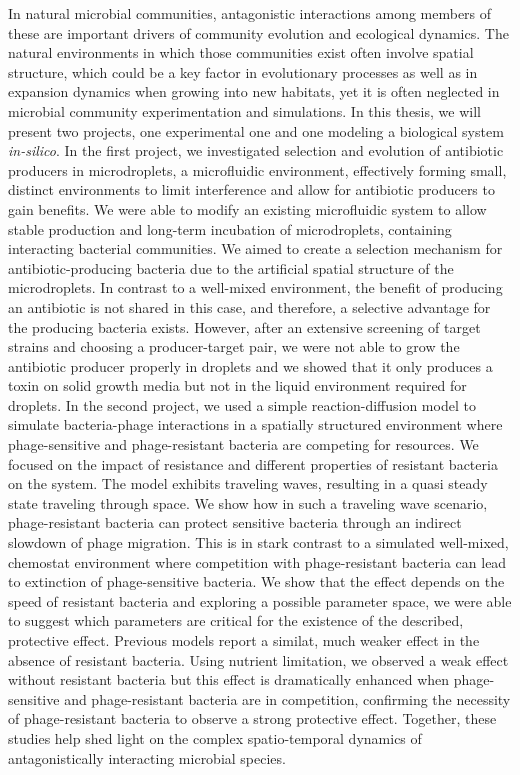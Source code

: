 {In natural microbial communities, antagonistic interactions among members of these are important drivers of community evolution and ecological dynamics. The natural environments in which those communities exist often involve spatial structure, which could be a key factor in evolutionary processes as well as in expansion dynamics when growing into new habitats, yet it is often neglected in microbial community experimentation and simulations. In this thesis, we will present two projects, one experimental one and one modeling a biological system \textit{in-silico}. In the first project, we investigated selection and evolution of antibiotic producers in microdroplets, a microfluidic environment, effectively forming small, distinct environments to limit interference and allow for antibiotic producers to gain benefits. We were able to modify an existing microfluidic system to allow stable production and long-term incubation of microdroplets, containing interacting bacterial communities. We aimed to create a selection mechanism for antibiotic-producing bacteria due to the artificial spatial structure of the microdroplets. In contrast to a well-mixed environment, the benefit of producing an antibiotic is not shared in this case, and therefore, a selective advantage for the producing bacteria exists. However, after an extensive screening of target strains and choosing a producer-target pair, we were not able to grow the antibiotic producer properly in droplets and we showed that it only produces a toxin on solid growth media but not in the liquid environment required for droplets. In the second project, we used a simple reaction-diffusion model to simulate bacteria-phage interactions in a spatially structured environment where phage-sensitive and phage-resistant bacteria are competing for resources. We focused on the impact of resistance and different properties of resistant bacteria on the system. The model exhibits traveling waves, resulting in a quasi steady state traveling through space. We show how in such a traveling wave scenario, phage-resistant bacteria can protect sensitive bacteria through an indirect slowdown of phage migration. This is in stark contrast to a simulated well-mixed, chemostat environment where competition with phage-resistant bacteria can lead to extinction of phage-sensitive bacteria. We show that the effect depends on the speed of resistant bacteria and exploring a possible parameter space, we were able to suggest which parameters are critical for the existence of the described, protective effect. Previous models report a similat, much weaker effect in the absence of resistant bacteria. Using nutrient limitation, we observed a weak effect without resistant bacteria but this effect is dramatically enhanced when phage-sensitive and phage-resistant bacteria are in competition, confirming the necessity of phage-resistant bacteria to observe a strong protective effect. Together, these studies help shed light on the complex spatio-temporal dynamics of antagonistically interacting microbial species. 

}
